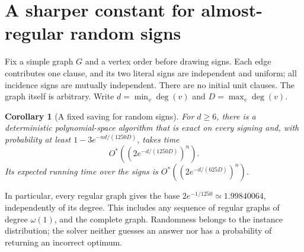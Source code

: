 \documentclass[11pt,a4paper]{article}
\newtheorem{corollary}[theorem]{Corollary}
\theoremstyle{definition}
\theoremstyle{remark}
\newcommand{\Ostar}{O^{*}}
\begin{document}
\appendix
\section{A sharper constant for almost-regular random signs}\label{app:regular}

Fix a simple graph $G$ and a vertex order before drawing signs. Each edge
contributes one clause, and its two literal signs are independent and uniform;
all incidence signs are mutually independent. There are no initial unit
clauses. The graph itself is arbitrary. Write
$d=\min_v\deg(v)$ and $D=\max_v\deg(v)$.

\begin{corollary}[A fixed saving for random signs]\label{thm:random}
For $d\ge6$, there is a deterministic polynomial-space algorithm that is
exact on every signing and, with probability at least
$1-3e^{-nd/(1250D)}$, takes time
\[
 \Ostar\left((2e^{-d/(1250D)})^n\right).
\]
Its expected running time over the signs is
$\Ostar((2e^{-d/(625D)})^n)$.
\end{corollary}

In particular, every regular graph gives the base
$2e^{-1/1250}\simeq1.99840064$, independently of its degree. This includes
any sequence of regular graphs of degree $\omega(1)$, and the complete graph.
Randomness belongs to the instance distribution; the solver neither guesses
an answer nor has a probability of returning an incorrect optimum.
\end{document}
